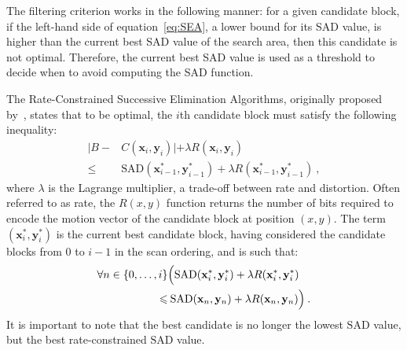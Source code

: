\documentclass{article}
\newcommand{\beq}{\begin{dmath}}
\newcommand{\eeq}{\end{dmath}}
\newcommand{\SAD}{\text{SAD}}
\newcommand{\vx}{\mathbf{x}}
\newcommand{\vy}{\mathbf{y}}
\begin{document}
The filtering criterion works in the following manner: for a given candidate
block, if the left-hand side of equation~\eqref{eq:SEA}, a lower bound for
its SAD value, is higher than the current best SAD value of the search area,
then this candidate is not optimal. Therefore, the current best SAD value is used
as a threshold to decide when to avoid computing the SAD function.

The Rate-Constrained Successive Elimination Algorithms, originally proposed
by~\cite{Coban1998a}, states that to be optimal, the $i$th candidate block must
satisfy the following inequality:
\vspace{-0.2em}
\beq
\begin{aligned}
| B - &C(\vx_i,\vy_i) | + \lambda R(\vx_i,\vy_i) \\ \leqslant
& \SAD(\vx^*_{i-1},\vy^*_{i-1}) + \lambda R(\vx^*_{i-1},\vy^*_{i-1}) \:,
\end{aligned}
\label{eq:RDSEA}
\eeq 
\vspace{-0.2em}
where $\lambda$ is the Lagrange multiplier, a trade-off between rate and
distortion. Often referred to as rate, the $R(x,y)$ function returns the number
of bits required to encode the motion vector of the candidate block at position
$(x,y)$. The term $(\vx^*_{i}, \vy^*_{i})$ is the current best candidate block,
having considered the candidate blocks from 0 to $i-1$ in the scan ordering, and
is such that:
\vspace{-0.2em}
\beq
\begin{aligned}
\forall n \in \{0,\ldots,i\} & \Bigl( \SAD(\vx^*_{i},\vy^*_{i}) + \lambda
R(\vx^*_{i},\vy^*_{i}) \\ 
\leqslant & \: \SAD(\vx_{n},\vy_{n}) + \lambda
R(\vx_{n},\vy_{n})\Bigr)\:.
\end{aligned}
\eeq
\vspace{-0.2em}
It is important to note that the best candidate is no longer the lowest $\SAD$
value, but the best rate-constrained $\SAD$ value. 
\end{document}
